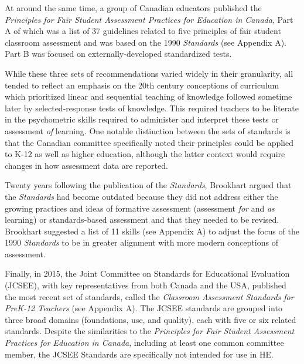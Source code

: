 \documentclass[
]{book}
\begin{document}
At around the same time, a group of Canadian educators published the \emph{Principles for Fair Student Assessment Practices for Education in Canada}, Part A of which was a list of 37 guidelines related to five principles of fair student classroom assessment and was based on the 1990 \emph{Standards} (see Appendix A). Part B was focused on externally-developed standardized tests.

While these three sets of recommendations varied widely in their granularity, all tended to reflect an emphasis on the 20th century conceptions of curriculum which prioritized linear and sequential teaching of knowledge followed sometime later by selected-response tests of knowledge. This required teachers to be literate in the psychometric skills required to administer and interpret these tests \citep{delucaTeacherAssessmentLiteracy2016, shepardRoleAssessmentLearning2000, xuTeacherAssessmentLiteracy2016} or assessment \emph{of} learning. One notable distinction between the sets of standards is that the Canadian committee specifically noted their principles could be applied to K-12 as well as higher education, although the latter context would require changes in how assessment data are reported.

Twenty years following the publication of the \emph{Standards}, Brookhart \citeyearpar{brookhartEducationalAssessmentKnowledge2011} argued that the \emph{Standards} had become outdated because they did not address either the growing practices and ideas of formative assessment (assessment \emph{for} and \emph{as} learning) or standards-based assessment and that they needed to be revised. Brookhart suggested a list of 11 skills (see Appendix A) to adjust the focus of the 1990 \emph{Standards} to be in greater alignment with more modern conceptions of assessment.

Finally, in 2015, the Joint Committee on Standards for Educational Evaluation (JCSEE), with key representatives from both Canada and the USA, published the most recent set of standards, called the \emph{Classroom Assessment Standards for PreK-12 Teachers} (see Appendix A). The JCSEE standards are grouped into three broad domains (foundations, use, and quality), each with five or six related standards. Despite the similarities to the \emph{Principles for Fair Student Assessment Practices for Education in Canada}, including at least one common committee member, the JCSEE Standards are specifically not intended for use in HE.
\end{document}
